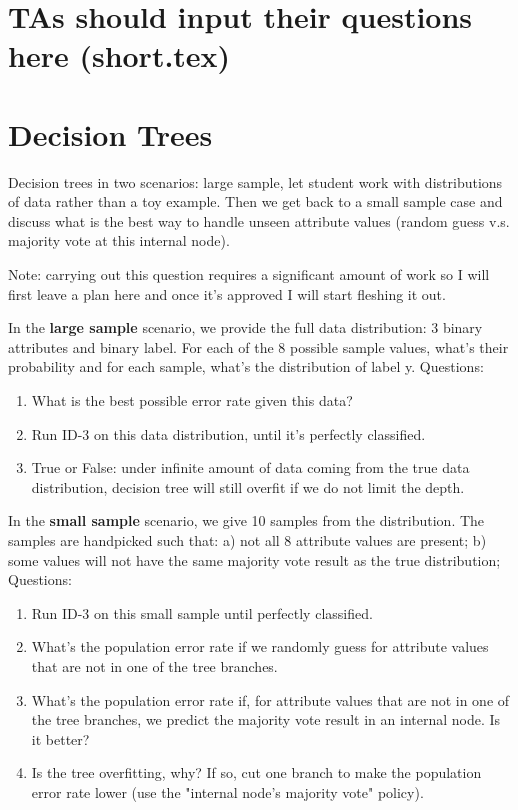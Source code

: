 \section{TAs should input their questions here (short.tex)}

\section{Decision Trees}
\begin{questions}
\question Decision trees in two scenarios: large sample, let student work with distributions of data rather than a toy example. Then we get back to a small sample case and discuss what is the best way to handle unseen attribute values (random guess v.s. majority vote at this internal node).

Note: carrying out this question requires a significant amount of work so I will first leave a plan here and once it's approved I will start fleshing it out.

In the \textbf{large sample} scenario, we provide the full data distribution: 3 binary attributes and binary label. For each of the 8 possible sample values, what's their probability and for each sample, what's the distribution of label y. Questions:

\begin{enumerate} [label=(\roman*)]
    \item What is the best possible error rate given this data?
    \item Run ID-3 on this data distribution, until it's perfectly classified.
    \item True or False: under infinite amount of data coming from the true data distribution, decision tree will still overfit if we do not limit the depth.
\end{enumerate}

In the \textbf{small sample} scenario, we give 10 samples from the distribution. The samples are handpicked such that: a) not all 8 attribute values are present; b) some values will not have the same majority vote result as the true distribution; Questions:

\begin{enumerate} [label=(\roman*)]
    \item Run ID-3 on this small sample until perfectly classified.
    \item What's the population error rate if we randomly guess for attribute values that are not in one of the tree branches. 
    \item What's the population error rate if, for attribute values that are not in one of the tree branches, we predict the majority vote result in an internal node. Is it better?
    \item Is the tree overfitting, why? If so, cut one branch to make the population error rate lower (use the "internal node's majority vote" policy).
\end{enumerate}



\end{questions}
